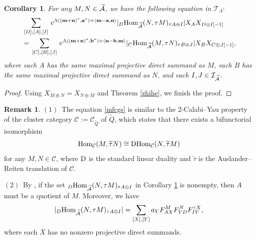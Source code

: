 \documentclass[reqno,12pt]{amsart}
\numberwithin{equation}{section}
\def\lr#1{\langle #1\rangle} \def\fin{\hfill$\square$}  \def\lra{\longrightarrow} \def\mod{\mbox{\rm \textbf{mod}}\,}\def\Mod{\mbox{\rm mod}\,}\def\top{\mbox{\rm top}\,}\def\soc{\mbox{\rm soc}\,}
\theoremstyle{plain} %
\newtheorem{corollary}[theorem]{\bf Corollary}
\theoremstyle{definition} %
\newtheorem{remark}[theorem]{\bf Remark}
\begin{document}
\begin{corollary}\label{2CY}
For any $M,N\in\widetilde{\mathcal{A}}$, we have the following equation in $\mathcal{T}_\Lambda:$
\begin{equation}\label{mfcgs}
\begin{split}
&\sum\limits_{\begin{smallmatrix}[D],[A],[I]\end{smallmatrix}}v^{\Lambda(({\bf m}+{\bf n})^*,{\bf a}^*)+\lr{{\bf m}-{\bf a},{\bf n}}}|_D\Hom_{\widetilde{\A}}(N,\tau M)_{\tau A\oplus I}|X_{A} X_{D\oplus I[-1]}\\&=
\sum\limits_{\begin{smallmatrix}[C],[B],[J]\end{smallmatrix}}v^{\Lambda(({\bf m}+{\bf n})^*,{\bf b}^*)+\lr{{\bf n}-{\bf b},{\bf m}}}|_C\Hom_{\widetilde{\A}}(M,\tau N)_{\tau B\oplus J}|X_{B} X_{C\oplus J[-1]},
\end{split}\end{equation}
where each $A$ has the same maximal projective direct summand as $M$, each $B$ has the same maximal projective direct summand as $N$, and each $I,J\in\mathcal{I}_{\widetilde{\mathcal{A}}}$.
\end{corollary}
\begin{proof}
Using $X_{M\oplus N}=X_{N\oplus M}$ and Theorem \ref{zhihe}, we finish the proof.
\end{proof}
\begin{remark}\label{zhuji}
$(1)$~The equation \eqref{mfcgs} is similar to the 2-Calabi--Yau property of the cluster category $\mathcal {C}:=\mathcal {C}_{\widetilde{Q}}$ of $\widetilde{Q}$, which states that there exists a bifunctorial isomorphism
$$\mbox{\rm Hom}_\mathcal {C}(M,\widetilde{\tau} N)\cong {\rm D}\mbox{\rm Hom}_\mathcal {C}(N,\widetilde{\tau} M)$$ for any $M,N\in\mathcal {C}$, where ${\rm D}$ is the standard linear duality and $\widetilde{\tau}$ is the Auslander--Reiten translation of $\mathcal {C}$.

$(2)$~By \cite[Lemma 4.4]{Rupel2},
if the set $_D\mbox{\rm Hom}_{\widetilde{\mathcal{A}}}(N,\tau M)_{\tau A\oplus I}$ in Corollary \ref{2CY} is nonempty, then $A$ must be a quotient of $M$. Moreover, we have
\begin{equation}\label{sxhomjs}
|_D\mbox{\rm Hom}_{\widetilde{\mathcal{A}}}(N,\tau M)_{\tau A\oplus I}|=\sum\limits_{[X],[Y]}a_YF_{AX}^MF_{YD}^NF_{IY}^{\tau X},\end{equation}
where each $X$ has no nonzero projective direct summands.
\end{remark}
\end{document}
